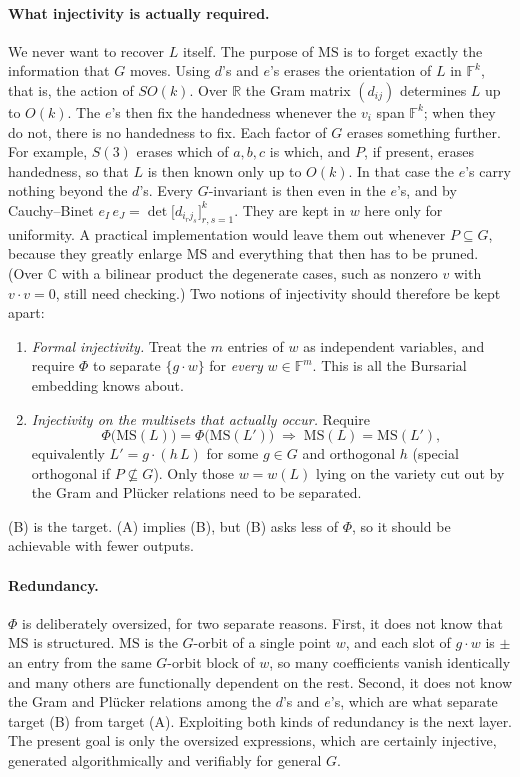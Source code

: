 \documentclass[11pt]{article}
\theoremstyle{definition}
\theoremstyle{remark}
\newcommand{\F}{\mathbb{F}}
\newcommand{\MS}{\mathrm{MS}}
\begin{document}
\paragraph{What injectivity is actually required.}
We never want to recover $L$ itself. The purpose of $\MS$ is to forget exactly
the information that $G$ moves. Using $d$'s and $e$'s erases the orientation
of $L$ in $\F^k$, that is, the action of $SO(k)$. Over $\mathbb{R}$ the Gram
matrix $(d_{ij})$ determines $L$ up to $O(k)$. The $e$'s then fix the handedness
whenever the $v_i$ span $\F^k$; when they do not, there is no handedness to fix.
Each factor of $G$ erases something further. For example, $S(3)$ erases which of
$a, b, c$ is which, and $P$, if present, erases handedness, so that $L$ is then
known only up to $O(k)$. In that case the $e$'s carry nothing beyond the $d$'s.
Every $G$-invariant is then even in the $e$'s, and by Cauchy--Binet
$e_I\, e_J = \det\bigl[d_{i_r j_s}\bigr]_{r,s=1}^{k}$. They are kept in $w$
here only for uniformity. A practical implementation would leave them out
whenever $P \subseteq G$, because they greatly enlarge $\MS$ and everything that
then has to be pruned.
(Over $\mathbb{C}$ with a bilinear product the degenerate cases, such as
nonzero $v$ with $v \cdot v = 0$, still need checking.) Two notions of
injectivity should therefore be kept apart:
\begin{enumerate}
  \item[(A)] \emph{Formal injectivity.} Treat the $m$ entries of $w$ as
    independent variables, and require $\Phi$ to separate $\{g \cdot w\}$ for
    \emph{every} $w \in \F^m$. This is all the Bursarial embedding knows about.
  \item[(B)] \emph{Injectivity on the multisets that actually occur.} Require
    \[
      \Phi\bigl(\MS(L)\bigr) = \Phi\bigl(\MS(L')\bigr)
      \;\Longrightarrow\; \MS(L) = \MS(L'),
    \]
    equivalently $L' = g \cdot (h\, L)$ for some $g \in G$ and orthogonal $h$
    (special orthogonal if $P \not\subseteq G$). Only those $w = w(L)$ lying
    on the variety cut out by the Gram and Plücker relations need to be
    separated.
\end{enumerate}
(B) is the target. (A) implies (B), but (B) asks less of $\Phi$, so it should
be achievable with fewer outputs.

\paragraph{Redundancy.}
$\Phi$ is deliberately oversized, for two separate reasons. First, it does not
know that $\MS$ is structured. $\MS$ is the $G$-orbit of a single point $w$,
and each slot of $g \cdot w$ is $\pm$ an entry from the same $G$-orbit block of
$w$, so many coefficients vanish identically and many others are functionally
dependent on the rest. Second, it does not know the Gram and Plücker
relations among the $d$'s and $e$'s, which are what separate target (B) from
target (A). Exploiting both kinds of redundancy is the next layer. The present goal is
only the oversized expressions, which are certainly injective, generated
algorithmically and verifiably for general $G$.
\end{document}
